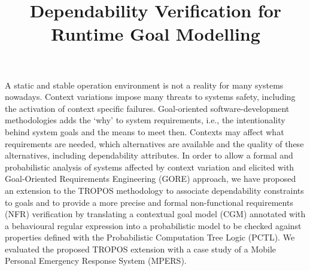 \documentclass[mestrado]{unb-cic}
\title{Dependability Verification for Runtime Goal Modelling}%
\begin{document}
  \maketitle

  \begin{dedicatoria}

  \end{dedicatoria}

  \begin{agradecimentos}

  \end{agradecimentos}


  \begin{resumo}
  A static and stable operation environment is not a reality for many systems nowadays. Context variations impose many threats to systems safety, including the activation of context specific failures. Goal-oriented software-development methodologies adds the `why' to system requirements, i.e., the intentionality behind system goals and the means to meet then. Contexts may affect what requirements are needed, which alternatives are available and the quality of these alternatives, including dependability attributes. In order to allow a formal and probabilistic analysis of systems affected by context variation and elicited with Goal-Oriented Requirements Engineering (GORE) approach, we have proposed an extension to the TROPOS methodology to associate dependability constraints to goals and to provide a more precise and formal non-functional requirements (NFR) verification by translating a contextual goal model (CGM) annotated with a behavioural regular expression into a probabilistic model to be checked against properties defined with the Probabilistic Computation Tree Logic (PCTL). We evaluated the proposed TROPOS extension with a case study of a Mobile Personal Emergency Response System (MPERS).
  
  
  \end{resumo}

  \begin{abstract}
  	
  \end{abstract}
  \tableofcontents
  \listoffigures
  \listoftables

\renewcommand{\appendixname}{Anexo}


  \textual
  
  
  
  
    
      
  
  
      
  

  \postextual
  
  

\appendix
\end{document}

